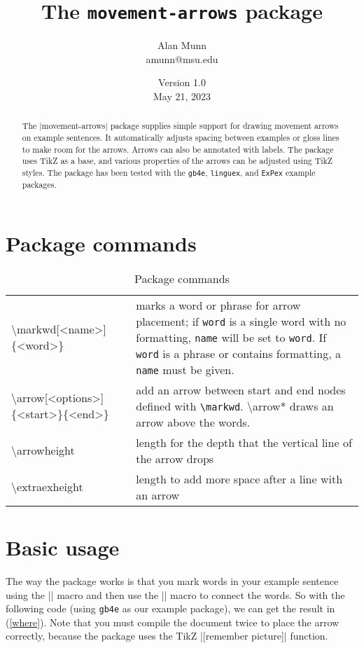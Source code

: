 \documentclass[11pt]{article}
\title{The \texttt{movement-arrows} package}
\author{Alan Munn\\amunn@msu.edu}
\date{Version 1.0\\May 21, 2023}
\newcommand*{\pkg}[1]{\texttt{#1}}
\newcommand*{\bs}{\textbackslash}
\begin{document}
\maketitle
\thispagestyle{empty}
\begin{abstract}{\noindent
The |movement-arrows| package supplies simple support for drawing movement arrows on example sentences. It automatically adjusts spacing between examples or gloss lines to make room for the arrows.  Arrows can also be annotated with labels.  The package uses TikZ as a base, and various properties of the arrows can be adjusted using TikZ styles. The package has been tested with the \pkg{gb4e}, \pkg{linguex}, and \pkg{ExPex} example packages.


}
\end{abstract}
\section{Package commands}
\begin{table}[htpb]
\centering
\begin{tabularx}{.9\textwidth}{t{l}X}
\toprule
\bs markwd[<name>]\{<word>\} & marks a word or phrase for arrow placement; if \pkg{word} is a single word with no formatting, \pkg{name} will be set to \pkg{word}. If \pkg{word} is a phrase or contains formatting, a \pkg{name} must be given.\\
\bs arrow[<options>]\{<start>\}\{<end>\} & add an arrow between start and end nodes defined with \pkg{\bs markwd}. \bs arrow* draws an arrow above the words.\\
\bs arrowheight & length for the depth that the vertical line of the arrow drops\\
\bs extraexheight & length to add more space after a line with an arrow\\
\bottomrule
\end{tabularx}
\caption{Package commands}
\end{table}
\section{Basic usage}
The way the package works is that you mark words in your example sentence using the |\mkword| macro and then use the |\arrow| macro to connect the words. So with the following code (using \pkg{gb4e} as our example package), we can get the result in (\ref{where}).  Note that you must compile the document twice to place the arrow correctly, because the package uses the TikZ |[remember picture]| function.
\end{document}
